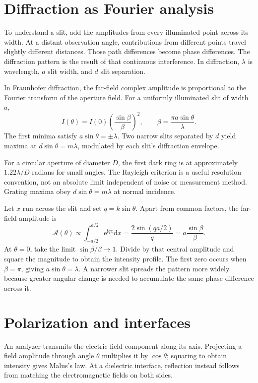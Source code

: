 \documentclass[11pt,oneside]{book}
\newcommand{\dd}{\mathrm{d}}
\newcommand{\ii}{\mathrm{i}}
\newcommand{\ee}{\mathrm{e}}
\theoremstyle{reviewstyle}
\begin{document}
\section{Diffraction as Fourier analysis}
To understand a slit, add the amplitudes from every illuminated point across its width. At a distant observation angle, contributions from different points travel slightly different distances. Those path differences become phase differences. The diffraction pattern is the result of that continuous interference. In diffraction, $\lambda$ is wavelength, $a$ slit width, and $d$ slit separation.

In Fraunhofer diffraction, the far-field complex amplitude is proportional to the Fourier transform of the aperture field. For a uniformly illuminated slit of width $a$,
\begin{equation}
I(\theta)=I(0)\left(\frac{\sin\beta}{\beta}\right)^2,
\qquad \beta=\frac{\pi a\sin\theta}{\lambda}.
\end{equation}
The first minima satisfy $a\sin\theta=\pm\lambda$. Two narrow slits separated by $d$ yield maxima at $d\sin\theta=m\lambda$, modulated by each slit's diffraction envelope.

For a circular aperture of diameter $D$, the first dark ring is at approximately $1.22\lambda/D$ radians for small angles. The Rayleigh criterion is a useful resolution convention, not an absolute limit independent of noise or measurement method. Grating maxima obey $d\sin\theta=m\lambda$ at normal incidence.

Let $x$ run across the slit and set $q=k\sin\theta$. Apart from common factors, the far-field amplitude is
\begin{equation}
\mathcal A(\theta)\propto\int_{-a/2}^{a/2}\ee^{\ii qx}\dd x
=\frac{2\sin(qa/2)}q
=a\frac{\sin\beta}{\beta}.
\end{equation}
At $\theta=0$, take the limit $\sin\beta/\beta\to1$. Divide by that central amplitude and square the magnitude to obtain the intensity profile. The first zero occurs when $\beta=\pi$, giving $a\sin\theta=\lambda$. A narrower slit spreads the pattern more widely because greater angular change is needed to accumulate the same phase difference across it.

\section{Polarization and interfaces}
An analyzer transmits the electric-field component along its axis. Projecting a field amplitude through angle $\theta$ multiplies it by $\cos\theta$; squaring to obtain intensity gives Malus's law. At a dielectric interface, reflection instead follows from matching the electromagnetic fields on both sides.
\end{document}
